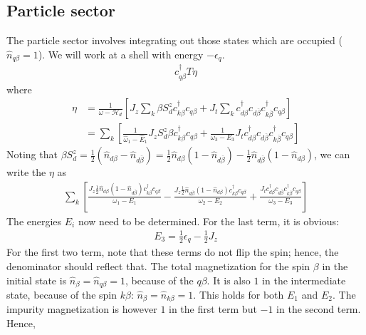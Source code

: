 \documentclass[twoside,11pt]{report}
\numberwithin{equation}{section}
\begin{document}
\subsection{Particle sector}
The particle sector involves integrating out those states which are occupied (\(\hat n_{q\beta}=1\)). We will work at a shell with energy \(-\epsilon_q\).
\begin{equation}\begin{aligned}
	c^\dagger_{q\beta}T \eta
\end{aligned}\end{equation}
where
\begin{equation}\begin{aligned}
	\label{partomega}
	\eta &= \frac{1}{\omega - \mathcal{H}_d} \left[ J_z\sum_k \beta S_d^z c^\dagger_{k\beta}c_{q\beta} + J_t \sum_k c^\dagger_{d\beta}c_{d\overline\beta} c^\dagger_{k\overline\beta}c_{q\beta} \right]\\
	     &=\sum_k \left[\frac{1}{\hat \omega_1 - \hat E_1 } J_z S_d^z \beta c^\dagger_{k\beta}c_{q\beta} + \frac{1}{\omega_3 - E_3}J_t  c^\dagger_{d\beta}c_{d\overline\beta} c^\dagger_{k\overline\beta}c_{q\beta}\right] 
\end{aligned}\end{equation}
Noting that \(\beta S_d^z = \frac{1}{2}\left( \hat n_{d\beta} - \hat n_{d\overline\beta} \right) = \frac{1}{2}\hat n_{d\beta}\left( 1 - \hat n_{d\overline\beta} \right) - \frac{1}{2}\hat n_{d\overline\beta}\left( 1 - \hat n_{d\beta} \right)\), we can write the \(\eta\) as
\begin{equation}\begin{aligned}
	     \sum_k \left[\frac{ J_z \frac{1}{2}\hat n_{d\beta}\left( 1 - \hat n_{d\overline\beta} \right) c^\dagger_{k\beta}c_{q\beta}}{\omega_1 - E_1} - \frac{J_z \frac{1}{2}\hat n_{d\overline\beta}\left( 1 - \hat n_{d\beta} \right) c^\dagger_{k\beta}c_{q\beta}}{\omega_2 - E_2} + \frac{J_t  c^\dagger_{d\beta}c_{d\overline\beta} c^\dagger_{k\overline\beta}c_{q\beta}}{\omega_3 - E_3}\right] 
\end{aligned}\end{equation}
The energies \(E_i\) now need to be determined. For the last term, it is obvious:
\begin{equation}\begin{aligned}
	E_3 = \frac{1}{2}\epsilon_q - \frac{1}{2}J_z
\end{aligned}\end{equation}
For the first two term, note that these terms do not flip the spin; hence, the denominator should reflect that. The total magnetization for the spin \(\beta\) in the initial state is \(\hat n_\beta = \hat n_{q\beta} = 1\), because of the \(q\beta\). It is also \(1\) in the intermediate state, because of the spin \(k\beta\): \(\hat n_\beta = \hat n_{k\beta} = 1\). This holds for both \(E_1\) and \(E_2\). The impurity magnetization is however \(1\) in the first term but \(-1\) in the second term. Hence,
\end{document}
